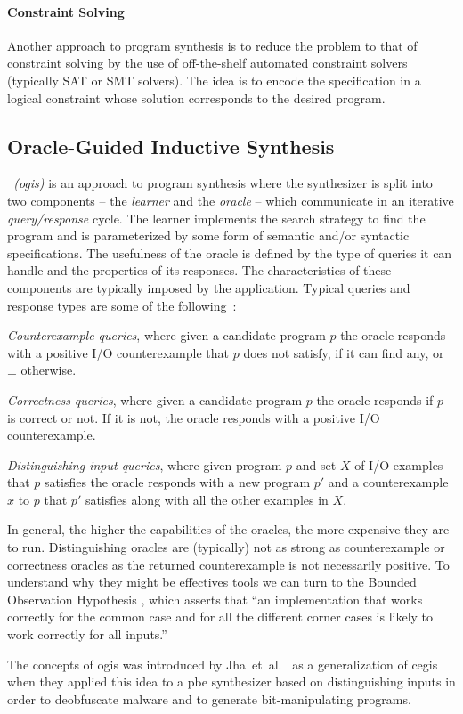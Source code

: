 \paragraph{Constraint Solving}
\label{sec:constraint-solving}

Another approach to program synthesis is to reduce the problem to that of
constraint solving by the use of off-the-shelf automated constraint
solvers~\cite{Feng:2018:PSU,Feng:2017:CST,Feng:2017:CSC,Solar-Lezama:2008,Jha:oracle:2010}
(typically SAT or SMT solvers).
The idea is to encode the specification in a logical constraint whose solution
corresponds to the desired program.

\subsection{Oracle-Guided Inductive Synthesis}
\label{sec:ogis}

\textit{~(\Gls{ogis})} is an approach to program synthesis
where the synthesizer is split into two components -- the \textit{learner} and the
\textit{oracle} -- which communicate in an iterative \textit{query/response}
cycle.
The learner implements the search strategy to find the program and is
parameterized by some form of semantic and/or syntactic specifications.
The usefulness of the oracle is defined by the type of queries it can handle and
the properties of its responses. The characteristics of these components are
typically imposed by the application.
Typical queries and response types are some of the following~\cite{Jha:2017:TFS}:
%
\begin{compactitem}
\item \textit{Counterexample queries}, where given a candidate program $p$ the
  oracle responds with a positive I/O counterexample that $p$ does not satisfy,
  if it can find any, or $\bot$ otherwise.
\item \textit{Correctness queries}, where given a candidate program $p$ the
  oracle responds if $p$ is correct or not. If it is not, the oracle responds
with a positive I/O counterexample.
\item \textit{Distinguishing input queries}, where given program $p$ and set $X$
  of I/O examples that $p$ satisfies the oracle responds with a new program $p'$
  and a counterexample $x$ to $p$ that $p'$ satisfies along with all the other
  examples in $X$.
\end{compactitem}

In general, the higher the capabilities of the oracles, the more expensive they
are to run. Distinguishing oracles are (typically) not as strong as
counterexample or correctness oracles as the returned counterexample is not
necessarily positive. To understand why they might be effectives tools we can
turn to the Bounded Observation Hypothesis \cite{Solar-Lezama:2008}, which
asserts that ``an implementation that works correctly for the common case and
for all the different corner cases is likely to work correctly for all inputs.''

The concepts of \gls{ogis} was introduced by Jha~et~al.~\cite{Jha:oracle:2010}
as a generalization of \gls{cegis} when they applied this idea to a \gls{pbe}
synthesizer based on distinguishing inputs in order to deobfuscate malware and
to generate bit-manipulating programs.
